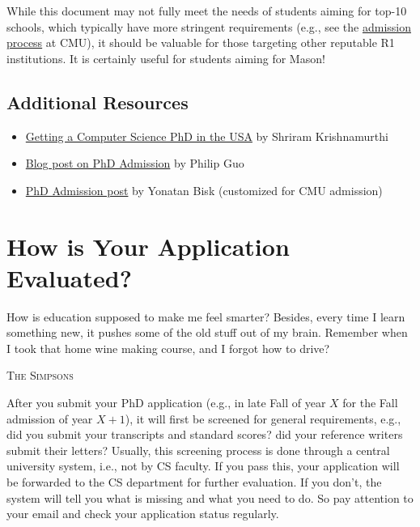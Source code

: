 \documentclass[oneside,11pt,dvipsnames]{book}
\begin{document}
While this document may not fully meet the needs of students aiming for top-10 schools, which typically have more stringent requirements (e.g., see the \href{https://da-data.blogspot.com/2015/03/reflecting-on-cs-graduate-admissions.html}{admission process} at CMU), it should be valuable for those targeting other reputable R1 institutions. It is certainly useful for students aiming for Mason!


\section*{Additional Resources}
\begin{itemize}
  \item \href{https://parentheticallyspeaking.org/articles/us-cs-phd-faq/}{Getting a Computer Science PhD in the USA} by Shriram Krishnamurthi
  \item  \href{https://pg.ucsd.edu/PhD-application-tips.htm}{Blog post on PhD Admission} by Philip Guo
  \item   \href{https://talkingtorobots.com/FAQ.html}{PhD Admission post} by Yonatan Bisk (customized for CMU admission)
\end{itemize}

\chapter{How is Your Application Evaluated?}\label{sec:evalapps}

\epigraph{How is education supposed to make me feel smarter? Besides, every time I learn something new, it pushes some of the old stuff out of my brain. Remember when I took that home wine making course, and I forgot how to drive?}{\textsc{The Simpsons}}

After you submit your PhD application (e.g., in late Fall of year $X$ for the Fall admission of year $X+1$), it will first be screened
for general requirements, e.g., did you submit your transcripts and standard scores? did your reference writers submit their letters? Usually, this screening process is done through a central university system, i.e., not by CS faculty. If you pass this, your application will be forwarded to the CS department for further evaluation. If you don't,  the system will tell you what is missing and what you need to do. So pay attention to your email and check your application status regularly.
\end{document}
